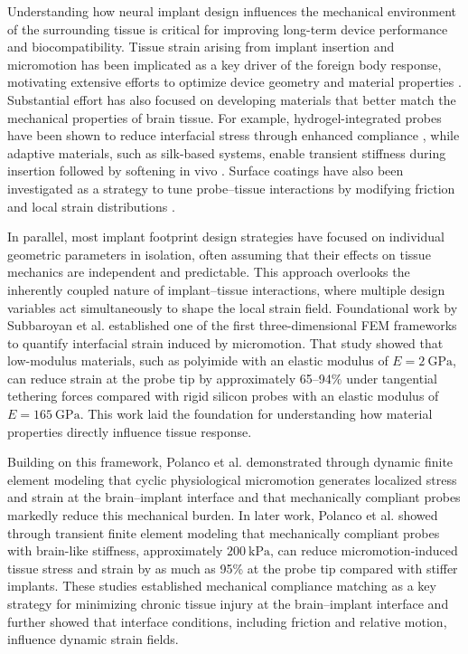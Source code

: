\documentclass[fleqn,10pt]{wlscirep}
\begin{document}
Understanding how neural implant design influences the mechanical environment of the surrounding tissue is critical for improving long-term device performance and biocompatibility. Tissue strain arising from implant insertion \cite{Singh2016, Guo2022, Lee2013, Zhang2021, Casanova2014} and micromotion \cite{Subbaroyan2005, Polanco2012, Polanco2014, Muthuswamy2003} has been implicated as a key driver of the foreign body response, motivating extensive efforts to optimize device geometry \cite{Lee2013, Kim2021, Zhu2011, Zhou2022} and material properties \cite{Park2021, Zhou2022, Andrei2012}. Substantial effort has also focused on developing materials that better match the mechanical properties of brain tissue. For example, hydrogel-integrated probes have been shown to reduce interfacial stress through enhanced compliance \cite{Park2021}, while adaptive materials, such as silk-based systems, enable transient stiffness during insertion followed by softening in vivo \cite{Zhou2022}. Surface coatings have also been investigated as a strategy to tune probe--tissue interactions by modifying friction and local strain distributions \cite{Andrei2012}.

In parallel, most implant footprint design strategies have focused on individual geometric parameters in isolation, often assuming that their effects on tissue mechanics are independent and predictable. This approach overlooks the inherently coupled nature of implant--tissue interactions, where multiple design variables act simultaneously to shape the local strain field. Foundational work by Subbaroyan et al. \cite{Subbaroyan2005} established one of the first three-dimensional FEM frameworks to quantify interfacial strain induced by micromotion. That study showed that low-modulus materials, such as polyimide with an elastic modulus of $E = 2~\mathrm{GPa}$, can reduce strain at the probe tip by approximately 65--94\% under tangential tethering forces compared with rigid silicon probes with an elastic modulus of $E = 165~\mathrm{GPa}$. This work laid the foundation for understanding how material properties directly influence tissue response.

Building on this framework, Polanco et al. \cite{Polanco2012} demonstrated through dynamic finite element modeling that cyclic physiological micromotion generates localized stress and strain at the brain--implant interface and that mechanically compliant probes markedly reduce this mechanical burden. In later work, Polanco et al. \cite{Polanco2016} showed through transient finite element modeling that mechanically compliant probes with brain-like stiffness, approximately $200~\mathrm{kPa}$, can reduce micromotion-induced tissue stress and strain by as much as 95\% at the probe tip compared with stiffer implants. These studies established mechanical compliance matching as a key strategy for minimizing chronic tissue injury at the brain--implant interface and further showed that interface conditions, including friction and relative motion, influence dynamic strain fields.
\end{document}
